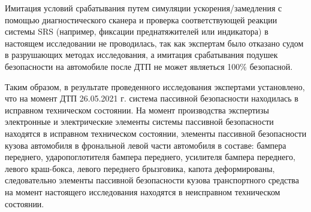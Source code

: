 Имитация условий срабатывания путем симуляции ускорения/замедления с помощью диагностического сканера   и проверка соответствующей реакции системы SRS  (например, фиксации преднатяжителей или индикатора) в настоящем исследовании не проводилась, так как экспертам было отказано судом в разрушающих методах исследования, а имитация срабатывания подушек безопасности на автомобиле после ДТП не может являеться 100\% безопасной.


Таким образом, в результате проведенного исследования экспертами установлено, что на момент ДТП 26.05.2021 г. система пассивной безопасности находилась в исправном техническом состоянии.  На момент производства экспертизы электронные и электрические элементы системы пассивной безопасности находятся в исправном техническом состоянии, элементы пассивной безопасности кузова автомобиля в фрональной левой части автомобиля в составе: бампера переднего, ударопоглотителя бампера переднего, усилителя бампера переднего, левого краш-бокса, левого переднего брызговика, капота деформированы, следовательно элементы пассивной безопасности кузова транспортного средства на момент настоящего исследования находятся в неисправном техническом состоянии. 

